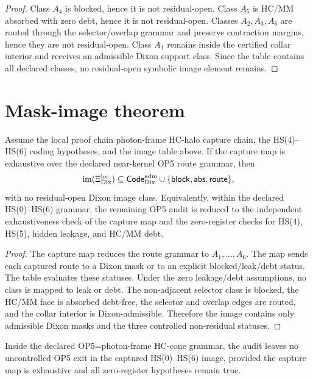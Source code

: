 \begin{proof}
Class \(A_4\) is blocked, hence it is not residual-open. Class \(A_5\) is HC/MM absorbed with zero debt, hence it is not residual-open. Classes \(A_2,A_3,A_6\) are routed through the selector/overlap grammar and preserve contraction margins, hence they are not residual-open. Class \(A_1\) remains inside the certified collar interior and receives an admissible Dixon support class. Since the table contains all declared classes, no residual-open symbolic image element remains.
\end{proof}

\section{Mask-image theorem}

\begin{theorem}
Assume the local proof chain photon-frame HC-halo capture chain, the HS(4)--HS(6) coding hypotheses, and the image table above. If the capture map is exhaustive over the declared near-kernel OP5 route grammar, then
\[
\operatorname{im}(\Xi_{\mathrm{Dix}}^{\mathrm{loc}})
\subseteq
\mathsf{Code}_{\mathrm{Dix}}^{\mathrm{adm}}
\cup
\{\mathsf{block},\mathsf{abs},\mathsf{route}\},
\]
with no residual-open Dixon image class. Equivalently, within the declared HS(0)--HS(6) grammar, the remaining OP5 audit is reduced to the independent exhaustiveness check of the capture map and the zero-register checks for HS(4), HS(5), hidden leakage, and HC/MM debt.
\end{theorem}

\begin{proof}
The capture map reduces the route grammar to \(A_1,\ldots,A_6\). The map sends each captured route to a Dixon mask or to an explicit blocked/leak/debt status. The table evaluates these statuses. Under the zero leakage/debt assumptions, no class is mapped to leak or debt. The non-adjacent selector class is blocked, the HC/MM face is absorbed debt-free, the selector and overlap edges are routed, and the collar interior is Dixon-admissible. Therefore the image contains only admissible Dixon masks and the three controlled non-residual statuses.
\end{proof}

\begin{corollary}
Inside the declared OP5=photon-frame HC-cone grammar, the audit leaves no uncontrolled OP5 exit in the captured HS(0)--HS(6) image, provided the capture map is exhaustive and all zero-register hypotheses remain true.
\end{corollary}

